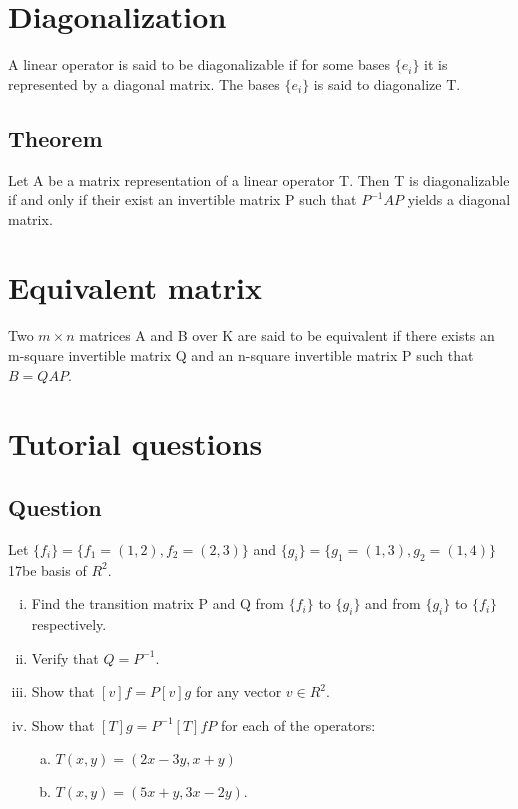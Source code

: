 \documentclass{book}
\begin{document}
\section{Diagonalization}

A linear operator is said to be diagonalizable if for some bases \(\{e_i\}\) it is represented by a diagonal matrix. The bases \(\{e_i\}\) is said to diagonalize T.

\subsection{Theorem}

Let A be a matrix representation of a linear operator T. Then T is diagonalizable if and only if their exist an invertible matrix P such that \(P^{-1} A P\) yields a diagonal matrix.

\section{Equivalent matrix}

Two \(m \times n\) matrices A and B over K are said to be equivalent if there exists an m-square invertible matrix Q and an n-square invertible matrix P such that \(B = QAP\).

\section{Tutorial questions}

\subsection{Question}

Let \(\{f_i\} = \{f_1 = (1, 2), f_2 = (2, 3)\}\) and \(\{g_i\} = \{g_1 = (1, 3), g_2 = (1, 4)\}\) 17be basis of \(R^2\).

\begin{enumerate}[i.]
	\item Find the transition matrix P and Q from \(\{f_i\}\) to \(\{g_i\}\) and from \(\{g_i\}\) to \(\{f_i\}\) respectively.
	\item Verify that \(Q = P^{-1}\).
	\item Show that \({[v]}f = P {[v]}g\) for any vector \(v \in R^2\).
	\item Show that \({[T]}g = P^{-1} {[T]}f P\) for each of the operators:

		\begin{enumerate}[a.]
			\item \(T(x, y) = (2x - 3y, x + y)\)
			\item \(T(x, y) = (5x + y, 3x - 2y)\).
		\end{enumerate}
\end{enumerate}
\end{document}
